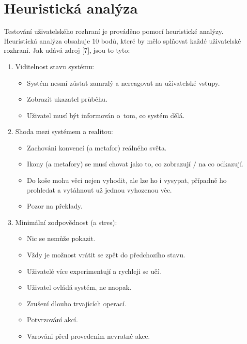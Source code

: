 \section{Heuristická analýza}

\label{nur:test}

Testování uživatelského rozhraní je prováděno pomocí heuristické analýzy. Heuristická analýza obsahuje 10 bodů, které by mělo splňovat každé uživatelské rozhraní. Jak udává zdroj [7], jsou to tyto:

\begin{enumerate}
    \item Viditelnost stavu systému:
        \begin{itemize}
            \item Systém nesmí zůstat zamrzlý a nereagovat na uživatelské vstupy.
            \item Zobrazit ukazatel průběhu.
            \item Uživatel musí být informován o~tom, co systém dělá.
        \end{itemize}
    \item Shoda mezi systémem a realitou:
        \begin{itemize}
            \item Zachováni konvencí (a metafor) reálného světa.
            \item Ikony (a metafory) se musí chovat jako to, co zobrazují / na co odkazují.
            \item Do koše mohu věci nejen vyhodit, ale lze ho i vysypat, případně ho prohledat a vytáhnout už jednou vyhozenou věc.
            \item Pozor na překlady.
        \end{itemize}
    \item Minimální zodpovědnost (a stres):
        \begin{itemize}
            \item Nic se nemůže pokazit.
            \item Vždy je možnost vrátit se zpět do předchozího stavu.
            \item Uživatelé více experimentují a rychleji se učí.
            \item Uživatel ovládá systém, ne naopak.
            \item Zrušení dlouho trvajících operací.
            \item Potvrzování akcí.
            \item Varováni před provedením nevratné akce.

\end{itemize}
\end{enumerate}
